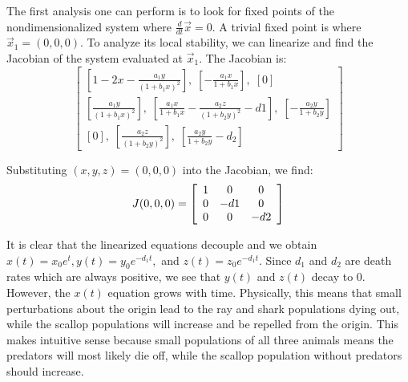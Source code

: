 \documentclass[12pt,journal,compsoc,twoside]{IEEEtran}
\begin{document}
The first analysis one can perform is to look for fixed points of the nondimensionalized system where $\frac{d}{dt}\vec{x} = 0$. A trivial fixed point is where $\vec{x}_1 = (0,0,0)$. To analyze its local stability, we can linearize and find the Jacobian of the system evaluated at $\vec{x}_1$. The Jacobian is:
\begin{equation}
\begin{bmatrix}
\left[1 - 2x - \frac{a_1 y}{(1 + b_1 x)^2}\right], \; \left[- \frac{a_1 x }{1 + b_1 x}\right], \; \left[0\right] \\
\left[\frac{a_1 y}{(1 + b_1 x)^2} \right], \; \left[\frac{a_1 x}{1 + b_1 x} - \frac{a_2 z}{(1 + b_2 y)^2} - d1 \right], \; \left[ - \frac{a_2 y}{1 + b_2 y} \right] \\
[0], \; \left[\frac{a_2 z}{(1 + b_2 y)^2} \right], \; \left[\frac{a_2 y}{1 + b_2 y} - d_2 \right] 
\end{bmatrix}
\end{equation}

Substituting $(x,y,z) = (0,0,0)$ into the Jacobian, we find:
\begin{equation}
J(0,0,0) = \left[ \begin{array}{c c c}
1 & 0 & 0 \\
0 & -d1 & 0 \\
0 & 0 & - d2
\end{array} \right]
\end{equation}

It is clear that the linearized equations decouple and we obtain $x(t) = x_0 e^t, y(t) = y_0 e^{-d_1 t},$ and $ z(t) = z_0 e^{-d_1 t}$. Since $d_1$ and $d_2$ are death rates which are always positive, we see that $y(t)$ and $z(t)$ decay to 0. However, the $x(t)$ equation grows with time. Physically, this means that small perturbations about the origin lead to the ray and shark populations dying out, while the scallop populations will increase and be repelled from the origin. This makes intuitive sense because small populations of all three animals means the predators will most likely die off, while the scallop population without predators should increase. 
\end{document}
